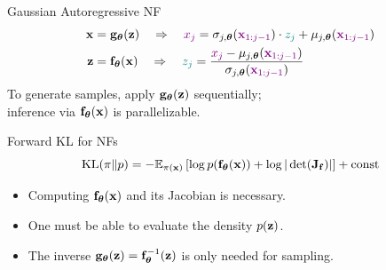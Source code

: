 \documentclass{beamer}
\begin{document}
\begin{frame}{Gaussian Autoregressive NF}
	\vspace{-0.5cm}
	\begin{align*}
		\mathbf{x} &= \mathbf{g}_{\boldsymbol{\theta}}(\mathbf{z}) \quad \Rightarrow \quad {\color{violet} x_j} = \sigma_{j, \boldsymbol{\theta}} ({\color{violet} \mathbf{x}_{1:j-1}}) \cdot {\color{teal} z_j} + \mu_{j, \boldsymbol{\theta}}({\color{violet} \mathbf{x}_{1:j-1}}) \\
		\mathbf{z} &= \mathbf{f}_{\boldsymbol{\theta}}(\mathbf{x}) \quad \Rightarrow \quad {\color{teal} z_j} = \frac{{\color{violet}x_j} - \mu_{j, \boldsymbol{\theta}}({\color{violet}\mathbf{x}_{1:j-1}})}{ \sigma_{j, \boldsymbol{\theta}} ({\color{violet}\mathbf{x}_{1:j-1}})}
	\end{align*}
	To generate samples, apply $\mathbf{g}_{\boldsymbol{\theta}}(\mathbf{z})$ sequentially;\\
	inference via $\mathbf{f}_{\boldsymbol{\theta}}(\mathbf{x})$ is parallelizable.

	\begin{block}{Forward KL for NFs}
		\vspace{-0.2cm}
		\[
			\mathrm{KL}(\pi \| p)  = -\mathbb{E}_{\pi(\mathbf{x})} \left[\log p(\mathbf{f}_{\boldsymbol{\theta}}(\mathbf{x})) + \log  |\det (\mathbf{J}_{\mathbf{f}})|\right] + \text{const}
		\]
		\vspace{-0.5cm}
		\begin{itemize}
			\item Computing $\mathbf{f}_{\boldsymbol{\theta}}(\mathbf{x})$ and its Jacobian is necessary.
			\item One must be able to evaluate the density $p(\mathbf{z})$.
			\item The inverse $\mathbf{g}_{\boldsymbol{\theta}}(\mathbf{z}) = \mathbf{f}_{\boldsymbol{\theta}}^{-1}(\mathbf{z})$ is only needed for sampling.
		\end{itemize}
	\end{block}
\end{frame}
\end{document}

